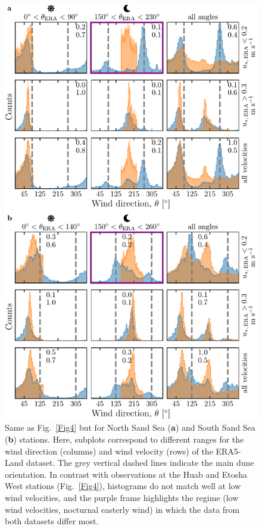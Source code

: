 \begin{figure}
\centering
\includegraphics[scale=1]{Figures/Figure6.pdf}
\caption{Same as Fig.~\ref{Fig4} but for North Sand Sea (\textbf{a}) and South Sand Sea (\textbf{b}) stations. Here, subplots correspond to different ranges for the wind direction (columns) and wind velocity (rows) of the ERA5-Land dataset. The grey vertical dashed lines indicate the main dune orientation. In contrast with observations at the Huab and Etosha West stations (Fig.~\ref{Fig4}), histograms do not match well at low wind velocities, and the purple frame highlights the regime (low wind velocities, nocturnal easterly wind) in which the data from both datasets differ most.}
\label{Fig6}
\end{figure}

